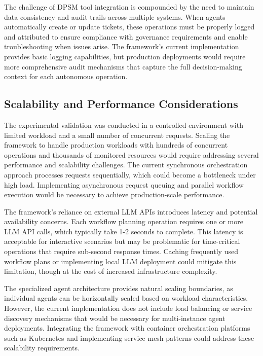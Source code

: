 \documentclass{article}
\begin{document}
The challenge of DPSM tool integration is compounded by the need to maintain data consistency and audit trails across multiple systems. When agents automatically create or update tickets, these operations must be properly logged and attributed to ensure compliance with governance requirements and enable troubleshooting when issues arise. The framework's current implementation provides basic logging capabilities, but production deployments would require more comprehensive audit mechanisms that capture the full decision-making context for each autonomous operation.

\subsection{Scalability and Performance Considerations}

The experimental validation was conducted in a controlled environment with limited workload and a small number of concurrent requests. Scaling the framework to handle production workloads with hundreds of concurrent operations and thousands of monitored resources would require addressing several performance and scalability challenges. The current synchronous orchestration approach processes requests sequentially, which could become a bottleneck under high load. Implementing asynchronous request queuing and parallel workflow execution would be necessary to achieve production-scale performance.

The framework's reliance on external LLM APIs introduces latency and potential availability concerns. Each workflow planning operation requires one or more LLM API calls, which typically take 1-2 seconds to complete. This latency is acceptable for interactive scenarios but may be problematic for time-critical operations that require sub-second response times. Caching frequently used workflow plans or implementing local LLM deployment could mitigate this limitation, though at the cost of increased infrastructure complexity.

The specialized agent architecture provides natural scaling boundaries, as individual agents can be horizontally scaled based on workload characteristics. However, the current implementation does not include load balancing or service discovery mechanisms that would be necessary for multi-instance agent deployments. Integrating the framework with container orchestration platforms such as Kubernetes and implementing service mesh patterns could address these scalability requirements.
\end{document}
